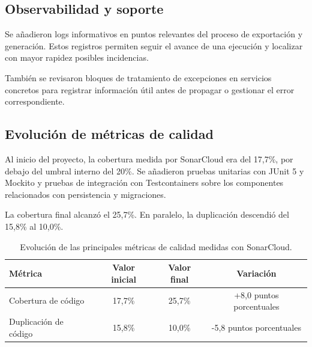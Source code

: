 \documentclass[11pt,a4paper,titlepage,oneside]{report}
\newcommand{\tfgtablestyle}{%
  \small
  \setlength{\tabcolsep}{4pt}%
  \renewcommand{\arraystretch}{1.15}%
  \rowcolors{2}{udcgray!08}{white}%
}
\begin{document}
\subsection{Observabilidad y soporte}

Se añadieron logs informativos en puntos relevantes del proceso de exportación
y generación. Estos registros permiten seguir el avance de una ejecución y
localizar con mayor rapidez posibles incidencias.

También se revisaron bloques de tratamiento de excepciones en servicios
concretos para registrar información útil antes de propagar o gestionar el
error correspondiente.

\subsection{Evolución de métricas de calidad}

Al inicio del proyecto, la cobertura medida por SonarCloud era del 17,7\%, por
debajo del umbral interno del 20\%. Se añadieron pruebas unitarias con JUnit 5 y
Mockito y pruebas de integración con Testcontainers sobre los componentes
relacionados con persistencia y migraciones.

La cobertura final alcanzó el 25,7\%. En paralelo, la duplicación descendió del
15,8\% al 10,0\%.

\begin{table}[H]
  \centering
  \tfgtablestyle
  \caption{Evolución de las principales métricas de calidad medidas con SonarCloud.}
  \label{tab:evolucion-sonar}

  \begin{tabular}{@{}lccc@{}}

    \toprule
    \rowcolor{udcpink!20}

    \textbf{Métrica} &
    \textbf{Valor inicial} &
    \textbf{Valor final} &
    \textbf{Variación} \\

    \midrule

    Cobertura de código &
    17,7\% &
    25,7\% &
    +8,0 puntos porcentuales \\

    Duplicación de código &
    15,8\% &
    10,0\% &
    -5,8 puntos porcentuales \\

    \bottomrule
  \end{tabular}

\end{table}
\end{document}
